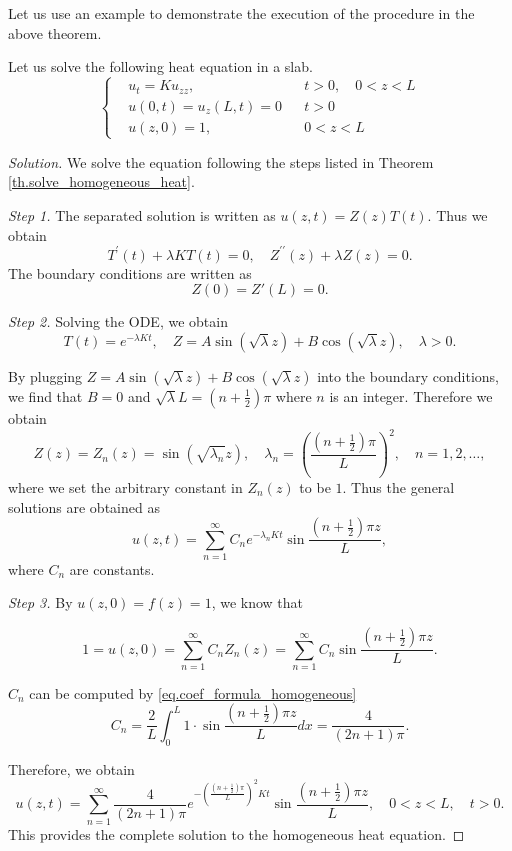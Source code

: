 Let us use an example to demonstrate the execution of the procedure in the above theorem. 
\begin{example}
    Let us solve the following heat equation in a slab.
    \begin{equation}
        \left\{
        \begin{aligned}
            &u_t=K u_{z z},\quad && t>0, \quad 0<z<L \\
            &u(0, t) = u_z(L, t)=0 && t>0 \\
            &u(z, 0)=1,\quad && 0<z<L
        \end{aligned}
        \right.
    \end{equation}
\end{example}
\begin{proof}[Solution] We solve the equation following the steps listed in Theorem \ref{th.solve_homogeneous_heat}.

\textit{Step 1.} The separated solution is written as $u(z, t)=Z(z) T(t)$. Thus we obtain
$$
T^{\prime}(t)+\lambda K T(t)=0, \quad Z^{\prime \prime}(z)+\lambda Z(z)=0 .
$$
The boundary conditions are written as
$$
Z(0)=Z'(L)=0 .
$$

\textit{Step 2.} Solving the ODE, we obtain
$$
T(t)=e^{-\lambda K t}, \quad Z=A \sin (\sqrt{\lambda} z)+B \cos (\sqrt{\lambda} z), \quad \lambda>0 .
$$

By plugging $Z=A \sin (\sqrt{\lambda} z)+B \cos (\sqrt{\lambda} z)$ into the boundary conditions, we find that $B=0$ and $\sqrt{\lambda} L = (n+\frac{1}{2})\pi$ where $n$ is an integer. Therefore we obtain
$$
Z(z)=Z_n(z)=\sin \left(\sqrt{\lambda_n} z\right), \quad \lambda_n=\left(\frac{(n+\frac{1}{2}) \pi}{L}\right)^2, \quad n=1,2, \ldots,
$$
where we set the arbitrary constant in $Z_n(z)$ to be $1$. Thus the general solutions are obtained as 
$$
u(z, t)=\sum_{n=1}^{\infty} C_n  e^{-\lambda_n K t} \sin \frac{(n+\frac{1}{2}) \pi z}{L},
$$
where $C_n$ are constants. 

\textit{Step 3.} By $u(z, 0) = f(z) = 1$, we know that 

$$
1 = u(z, 0) = \sum_{n=1}^{\infty} C_n Z_n(z) = \sum_{n=1}^{\infty} C_n \sin \frac{(n+\frac{1}{2}) \pi z}{L}.
$$

$C_n$ can be computed by \eqref{eq.coef_formula_homogeneous}
$$
C_n= \frac{2}{L} \int_0^L 1\cdot \sin \frac{(n+\frac{1}{2}) \pi z}{L} d x = \frac{4}{(2n+1)\pi}.
$$

Therefore, we obtain 
$$
u(z, t)=\sum_{n=1}^{\infty} \frac{4}{(2n+1)\pi} e^{-\left(\frac{(n+\frac{1}{2}) \pi}{L}\right)^2 K t} \sin \frac{(n+\frac{1}{2}) \pi z}{L}, \quad 0<z<L, \quad t>0 .
$$
This provides the complete solution to the homogeneous heat equation.
\end{proof}

